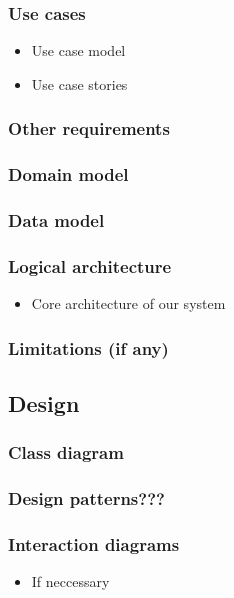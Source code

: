 \documentclass[11pt]{article}
\begin{document}
\subsubsection{Use cases}
\begin{itemize}
\item Use case model
\item Use case stories
\end{itemize}

\subsubsection{Other requirements}

\subsubsection{Domain model}

\subsubsection{Data model}

\subsubsection{Logical architecture}
\begin{itemize}
\item Core architecture of our system
\end{itemize}

\subsubsection{Limitations (if any)}

\subsection{Design}
\subsubsection{Class diagram}

\subsubsection{Design patterns???}

\subsubsection{Interaction diagrams}
\begin{itemize}
\item If neccessary
\end{itemize}
\end{document}
